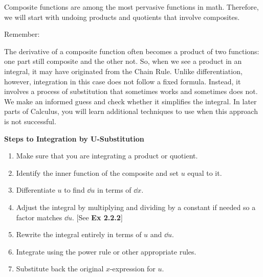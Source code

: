 Composite functions are among the most pervasive functions in math. Therefore, we will start with undoing products and quotients that involve composites. \par

Remember: \par

\begin{center}
\end{center}

The derivative of a composite function often becomes a product of two functions: one part still composite and the other not. So, when we see a product in an integral, it may have originated from the Chain Rule. Unlike differentiation, however, integration in this case does not follow a fixed formula. Instead, it involves a process of substitution that sometimes works and sometimes does not. We make an informed guess and check whether it simplifies the integral. In later parts of Calculus, you will learn additional techniques to use when this approach is not successful. \par

\textbf{Steps to Integration by U-Substitution} \par

\begin{enumerate}
    \item Make sure that you are integrating a product or quotient.
    \item Identify the inner function of the composite and set $u$ equal to it.
    \item Differentiate $u$ to find $\dd u$ in terms of $\dd x$.
    \item Adjust the integral by multiplying and dividing by a constant if needed so a factor matches $\dd u$. [See \textbf{Ex 2.2.2}]
    \item Rewrite the integral entirely in terms of $u$ and $\dd u$.
    \item Integrate using the power rule or other appropriate rules.
    \item Substitute back the original $x$-expression for $u$.
\end{enumerate}

